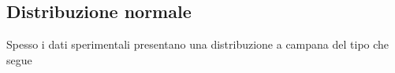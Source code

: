 \documentclass[onecolumn,12pt]{book}\usepackage[]{graphicx}\usepackage[]{color}
\newenvironment{solution}{\textbf{Soluzione}\newline}{}
\newenvironment{answerlist}{\renewcommand{\labelenumi}{(\alph{enumi})}\begin{enumerate}}{\end{enumerate}}
\begin{document}

 \subsection{Distribuzione normale}


Spesso  i dati sperimentali presentano una distribuzione a  campana del tipo che segue
\end{document}
